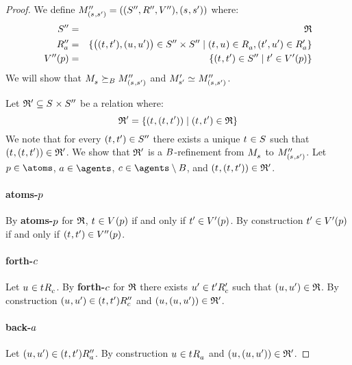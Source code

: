 \begin{proof}
We define $\kPModelAndTuplePP{(\kStateS, \kStateSP)}$ where:
\begin{eqnarray*}
    \kStatesPP &=& \refinement\\
    \kAccessibilityPPA &=& \{\big((\kStateT, \kStateTP), (\kStateU, \kStateUP)\big) \in \kStatesPP \times \kStatesPP \mid (\kStateT, \kStateU) \in \kAccessibilityA, (\kStateTP, \kStateUP) \in \kAccessibilityPA\}\\
    \kValuationPP(\atomP) &=& \{(\kStateT, \kStateTP) \in \kStatesPP \mid \kStateTP \in \kValuationP(\atomP)\}
\end{eqnarray*}
We will show that $\kPModel{\kStateS} \simulatesBs \kPModelPP{(\kStateS, \kStateSP)}$ and $\kPModelP{\kStateSP} \bisimilar \kPModelPP{(\kStateS, \kStateSP)}$.

Let $\refinement' \subseteq \kStates \times \kStatesPP$ be a relation where:
$$
\refinement' = \{(\kStateT, (\kStateT, \kStateTP)) \mid (\kStateT, \kStateTP) \in \refinement\}
$$
We note that for every $(\kStateT, \kStateTP) \in \kStatesPP$ there exists a unique $\kStateT \in \kStates$ such that $(\kStateT, (\kStateT, \kStateTP)) \in \refinement'$.
We show that $\mathfrak{R}'$ is a $B$-refinement from $\kPModel{\kStateS}$ to $\kPModelPP{(\kStateS, \kStateSP)}$.
Let $\atomP \in \atoms$, $\agentA \in \agents$, $\agentC \in \agents \setminus \agentsB$, and $(\kStateT, (\kStateT, \kStateTP)) \in \refinement'$.

\paragraph{atoms-$p$}
By {\bf atoms-$p$} for $\mathfrak{R}$, $\kStateT \in \kValuation(\atomP)$ if and only if ${t}^{\prime} \in {V^{\prime}}(p)$.
By construction ${t}^{\prime} \in {V^{\prime}}(p)$ if and only if $(\kStateT, \kStateTP) \in \kValuationPP(\atomP)$.

\paragraph{forth-$c$}
Let $\kStateU \in \kSuccessorsC{\kStateT}$.
By {\bf forth-$c$} for $\mathfrak{R}$ there exists ${u}^{\prime} \in {{t}^{\prime}} {R^{\prime}_{c}}$ such that $(\kStateU, \kStateUP) \in \refinement$.
By construction $(\kStateU, \kStateUP) \in \kSuccessorsPPC{(\kStateT, \kStateTP)}$ and $(\kStateU, (\kStateU, \kStateUP)) \in \refinement'$.

\paragraph{back-$a$}
Let $(\kStateU, \kStateUP) \in \kSuccessorsPPA{(\kStateT, \kStateTP)}$.
By construction $\kStateU \in \kSuccessorsA{\kStateT}$ and $(\kStateU, (\kStateU, \kStateUP)) \in \refinement'$.


\end{proof}
